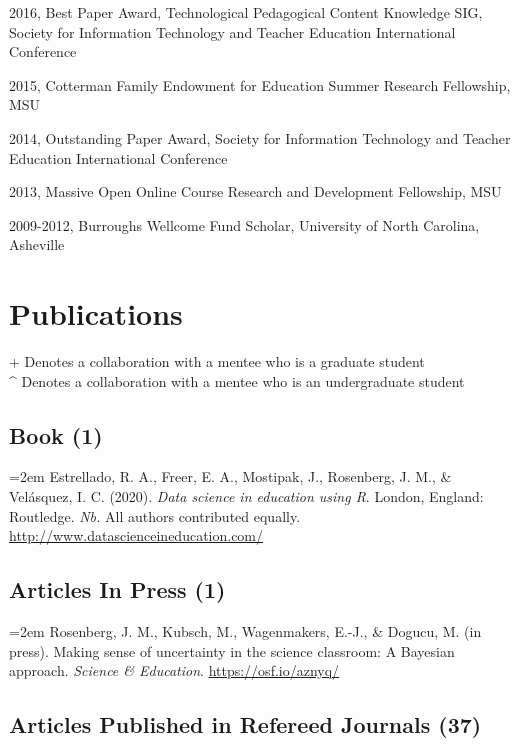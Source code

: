 \documentclass[
  14,
]{article}
\begin{document}
2016, Best Paper Award, Technological Pedagogical Content Knowledge SIG,
Society for Information Technology and Teacher Education International
Conference

2015, Cotterman Family Endowment for Education Summer Research
Fellowship, MSU

2014, Outstanding Paper Award, Society for Information Technology and
Teacher Education International Conference

2013, Massive Open Online Course Research and Development Fellowship,
MSU

2009-2012, Burroughs Wellcome Fund Scholar, University of North
Carolina, Asheville

\hypertarget{publications}{%
\section{Publications}\label{publications}}

+ Denotes a collaboration with a mentee who is a graduate student\\
\^{} Denotes a collaboration with a mentee who is an undergraduate
student

\hypertarget{book-1}{%
\subsection{Book (1)}\label{book-1}}

\hangindent=2em Estrellado, R. A., Freer, E. A., Mostipak, J.,
Rosenberg, J. M., \& Velásquez, I. C. (2020). \emph{Data science in
education using R}. London, England: Routledge. \emph{Nb.} All authors
contributed equally. \url{http://www.datascienceineducation.com/}

\hypertarget{articles-in-press-1}{%
\subsection{Articles In Press (1)}\label{articles-in-press-1}}

\hangindent=2em Rosenberg, J. M., Kubsch, M., Wagenmakers, E.-J., \&
Dogucu, M. (in press). Making sense of uncertainty in the science
classroom: A Bayesian approach. \emph{Science \& Education}.
\url{https://osf.io/aznyq/}

\hypertarget{articles-published-in-refereed-journals-37}{%
\subsection{Articles Published in Refereed Journals
(37)}\label{articles-published-in-refereed-journals-37}}
\end{document}
